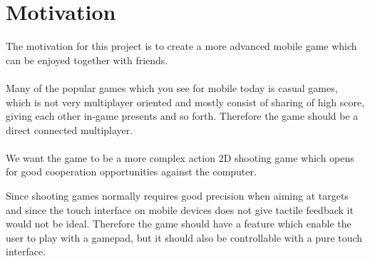 \section{Motivation} \label{sec:motivation}
The motivation for this project is to create a more advanced mobile game which can be enjoyed together with friends.\\\\
Many of the popular games which you see for mobile today is casual games\cite{appstore}\cite{googleplay}, which is not very multiplayer oriented and mostly consist of sharing of high score, giving each other in-game presents and so forth.
Therefore the game should be a direct connected multiplayer.\\\\
We want the game to be a more complex action 2D shooting game which opens for good cooperation opportunities against the computer.

Since shooting games normally requires good precision when aiming at targets and since the touch interface on mobile devices does not give tactile feedback it would not be ideal. Therefore the game should have a feature which enable the user to play with a gamepad, but it should also be controllable with a pure touch interface.

